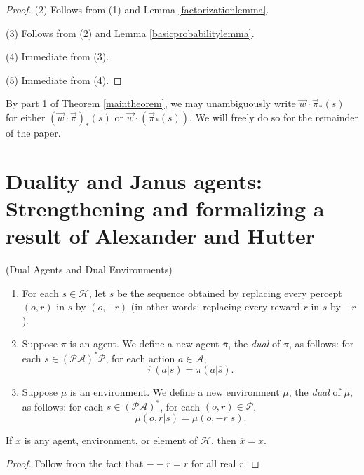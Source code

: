 \documentclass[runningheads]{llncs}
\begin{document}
\begin{proof}
    (2) Follows from (1) and Lemma \ref{factorizationlemma}.

    (3) Follows from (2) and Lemma \ref{basicprobabilitylemma}.

    (4) Immediate from (3).

    (5) Immediate from (4).
\end{proof}

By part 1 of Theorem \ref{maintheorem},
we may unambiguously write $\vec w\cdot \vec\pi_*(s)$
for either $(\vec w\cdot\vec\pi)_*(s)$ or $\vec w\cdot(\vec\pi_*(s))$.
We will freely do so for the remainder of the paper.

\section{Duality and Janus agents:
Strengthening and formalizing a result of Alexander and Hutter}

\begin{definition}
\label{dualagentsdefn}
(Dual Agents and Dual Environments)
\begin{enumerate}
    \item
    For each $s\in\mathcal H$, let $\overline s$ be the sequence obtained
    by replacing every percept $(o,r)$ in $s$ by $(o,-r)$ (in other words:
    replacing every reward $r$ in $s$ by $-r$).
    \item
    Suppose $\pi$ is an agent.
    We define a new agent $\overline \pi$, the \emph{dual} of $\pi$,
    as follows:
    for each $s\in (\mathcal P\mathcal A)^*\mathcal P$,
    for each action $a\in\mathcal A$,
    \[\overline\pi(a|s)=\pi(a|\overline s).\]
    \item
    Suppose $\mu$ is an environment.
    We define a new environment $\overline\mu$, the \emph{dual} of $\mu$,
    as follows:
    for each $s\in (\mathcal P\mathcal A)^*$,
    for each $(o,r)\in\mathcal P$,
    \[\overline\mu(o,r|s)=\mu(o,-r|\overline s).\]
\end{enumerate}
\end{definition}

\begin{lemma}
\label{doublenegationlemma}
    If $x$ is any agent, environment, or element of $\mathcal H$,
    then $\overline{\overline x}=x$.
\end{lemma}

\begin{proof}
    Follow from the fact that $--r=r$ for all real $r$.
\end{proof}
\end{document}
